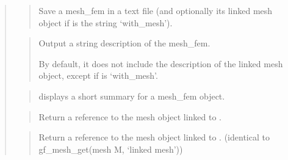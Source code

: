 \documentclass[a4paper,11pt,english]{sphinxmanual}
\begin{document}
\begin{quote}
\sphinxAtStartPar
{}
\begin{quote}

\sphinxAtStartPar
Save a mesh\_fem in a text file (and optionally its linked mesh object
if  is the string ‘with\_mesh’).
\end{quote}

\sphinxAtStartPar
{}
\begin{quote}

\sphinxAtStartPar
Output a string description of the mesh\_fem.

\sphinxAtStartPar
By default, it does not include the description of the linked mesh
object, except if  is ‘with\_mesh’.
\end{quote}

\sphinxAtStartPar
{}
\begin{quote}

\sphinxAtStartPar
displays a short summary for a mesh\_fem object.
\end{quote}

\sphinxAtStartPar
{}
\begin{quote}

\sphinxAtStartPar
Return a reference to the mesh object linked to .
\end{quote}

\sphinxAtStartPar
{}
\begin{quote}

\sphinxAtStartPar
Return a reference to the mesh object linked to .
(identical to gf\_mesh\_get(mesh M, ‘linked mesh’))
\end{quote}

\sphinxAtStartPar
{}
\begin{quote}


\end{quote}
\end{quote}
\end{document}
